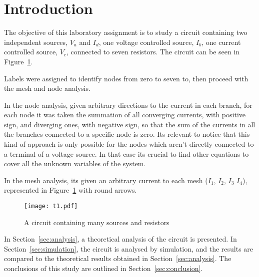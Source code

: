 \section{Introduction}
\label{sec:introduction}

The objective of this laboratory assignment is to study a circuit containing two independent sources, $V_a$ and $I_d$, one voltage controlled source, $I_b$, one current controlled source, $V_c$, connected to seven resistors. The circuit can be seen in Figure~\ref{fig1}.

Labels were assigned to identify nodes from zero to seven to, then proceed with the mesh and node analysis.

In the node analysis, given arbitrary directions to the current in each branch, for each node it was taken the summation of all converging currents, with positive sign, and diverging ones, with negative sign, so that the sum of the currents in all the branches connected to a specific node is zero. Its relevant to notice that this kind of approach is only possible for the nodes which aren't directly connected to a terminal of a voltage source. In that case its crucial to find other equations to cover all the unknown variables of the system.

In the mesh analysis, its given an arbitrary current to each mesh ($I_1$, $I_2$, $I_3$ $I_4$), represented in Figure~\ref{fig1} with round arrows. 



\begin{figure}[h] \centering
\texttt{[image: t1.pdf]}
\caption{A circuit containing many sources and resistors}
\label{fig1}
\end{figure}

In Section~\ref{sec:analysis}, a theoretical analysis of the circuit is
presented. In Section~\ref{sec:simulation}, the circuit is analysed by
simulation, and the results are compared to the theoretical results obtained in
Section~\ref{sec:analysis}. The conclusions of this study are outlined in
Section~\ref{sec:conclusion}.
